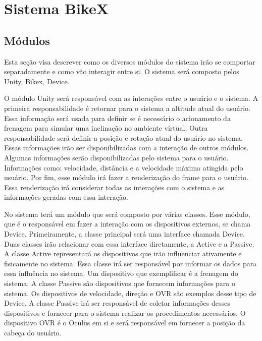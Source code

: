 \section{Sistema BikeX}
\label{sec:sistema_bikex}



\subsection{Módulos} \label{sec:modulos}
Esta seção visa descrever como os diversos módulos do sistema irão se comportar separadamente e como vão interagir entre si. O sistema será composto pelos Unity, Bikex, Device.

O módulo Unity será responsável com as interações entre o usuário e o sistema. A primeira responsabilidade é retornar para o sistema a altitude atual do usuário. Essa informação será usada para definir se é necessário o acionamento da frenagem para simular uma inclinação no ambiente virtual. Outra responsabilidade será definir a posição e rotação atual do usuário no sistema. Essas informações irão ser disponibilizadas com a interação de outros módulos. Algumas informações serão disponibilizadas pelo sistema para o usuário. Informações como: velocidade, distância e a velocidade máxima atingida pelo usuário. Por fim, esse módulo irá fazer a renderização do frame para o usuário. Essa renderização irá considerar todas as interações com o sistema e as informações geradas com essa interação.

No sistema terá um módulo que será composto por várias classes. Esse módulo, que é o responsável em fazer a interação com os dispositivos externos, se chama Device. Primeiramente, a classe principal será uma interface chamada Device. Duas classes irão relacionar com essa interface diretamente, a Active e a Passive. A classe Active representará os dispositivos que irão influenciar ativamente e fisicamente no sistema. Essa classe irá ser responsável por informar os dados para essa influência no sistema. Um dispositivo que exemplificar é a frenagem do sistema. A classe Passive são dispositivos que fornecem informações para o sistema. Os dispositivos de velocidade, direção e OVR são exemplos desse tipo de Device. A classe Passive irá ser responsável de coletar informações desses dispositivos e fornecer para o sistema realizar os procedimentos necessários. O dispositivo OVR é o Oculus em si e será responsável em fornecer a posição da cabeça do usuário.

